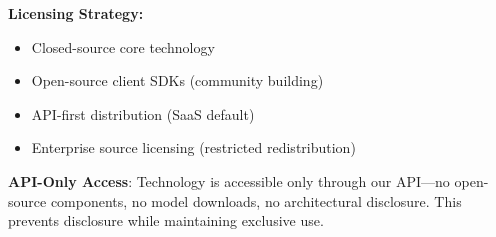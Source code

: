 \textbf{Licensing Strategy:}
\begin{itemize}[noitemsep]
    \item Closed-source core technology
    \item Open-source client SDKs (community building)
    \item API-first distribution (SaaS default)
    \item Enterprise source licensing (restricted redistribution)
\end{itemize}

\textbf{API-Only Access}: Technology is accessible only through our API—no open-source components, no model downloads, no architectural disclosure. This prevents disclosure while maintaining exclusive use.
